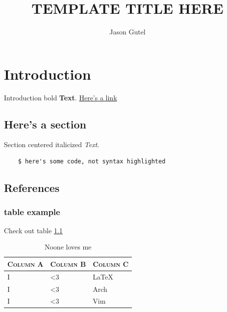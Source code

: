 \documentclass[oneside,english,chapters]{smireport}
\author{Jason Gutel}
\newcommand{\titletext}{TEMPLATE TITLE HERE}
\providecommand{\tabularnewline}{\\}
\begin{document}
\renewcommand\HeaderTitle{\titletext}{}

\renewcommand\DocNumber{9XXXX-Y}{}

\renewcommand\DocRev{A}{}

\renewcommand\SVNRevision{\$Rev\$}{}

\renewcommand\TitleBlockTitleLineOne{\titletext}{}

\renewcommand\TitleBlockTitleLineTwo{TEMPLATE Title Line 2}{}

\title{\titletext}

\maketitle
\tableofcontents{}

\listoffigures

\listoftables

\chapter{Introduction}
Introduction bold \textbf{Text}.
\newline
\href{https://github.com/gutelfuldead/dotfiles}{Here's a link}

\section{Here's a section}
\begin{center}Section centered italicized \textit{Text}.\end{center}
\begin{verbatim}
    $ here's some code, not syntax highlighted
\end{verbatim}

\section{References}
\subsection{table example}
Check out table \ref{tab:uselesstable}

\begin{table}[H]
  \begin{tabular}{|>{\centering}p{}|>{\centering}p{}|>{\centering}p{}|}
    \hline
    \textbf{\textsc{Column A}} & \textbf{\textsc{Column B}} & \textbf{\textsc{Column C}}\tabularnewline
    \hline
    \hline
    I & <3 & LaTeX\tabularnewline
    \hline
    I & <3 & Arch\tabularnewline
    \hline
    I & <3 & Vim\tabularnewline
    \hline
  \end{tabular}
  \caption{Noone loves me}\label{tab:uselesstable}
\end{table}
\end{document}

